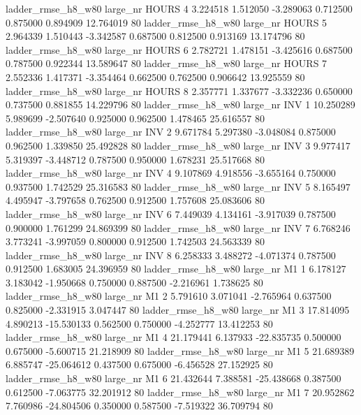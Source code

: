  ladder_rmse_h8_w80   large_nr    HOURS                 4  3.224518  1.512050  -3.289063 0.712500 0.875000  0.894909   12.764019 80
 ladder_rmse_h8_w80   large_nr    HOURS                 5  2.964339  1.510443  -3.342587 0.687500 0.812500  0.913169   13.174796 80
 ladder_rmse_h8_w80   large_nr    HOURS                 6  2.782721  1.478151  -3.425616 0.687500 0.787500  0.922344   13.589647 80
 ladder_rmse_h8_w80   large_nr    HOURS                 7  2.552336  1.417371  -3.354464 0.662500 0.762500  0.906642   13.925559 80
 ladder_rmse_h8_w80   large_nr    HOURS                 8  2.357771  1.337677  -3.332236 0.650000 0.737500  0.881855   14.229796 80
 ladder_rmse_h8_w80   large_nr      INV                 1 10.250289  5.989699  -2.507640 0.925000 0.962500  1.478465   25.616557 80
 ladder_rmse_h8_w80   large_nr      INV                 2  9.671784  5.297380  -3.048084 0.875000 0.962500  1.339850   25.492828 80
 ladder_rmse_h8_w80   large_nr      INV                 3  9.977417  5.319397  -3.448712 0.787500 0.950000  1.678231   25.517668 80
 ladder_rmse_h8_w80   large_nr      INV                 4  9.107869  4.918556  -3.655164 0.750000 0.937500  1.742529   25.316583 80
 ladder_rmse_h8_w80   large_nr      INV                 5  8.165497  4.495947  -3.797658 0.762500 0.912500  1.757608   25.083606 80
 ladder_rmse_h8_w80   large_nr      INV                 6  7.449039  4.134161  -3.917039 0.787500 0.900000  1.761299   24.869399 80
 ladder_rmse_h8_w80   large_nr      INV                 7  6.768246  3.773241  -3.997059 0.800000 0.912500  1.742503   24.563339 80
 ladder_rmse_h8_w80   large_nr      INV                 8  6.258333  3.488272  -4.071374 0.787500 0.912500  1.683005   24.396959 80
 ladder_rmse_h8_w80   large_nr       M1                 1  6.178127  3.183042  -1.950668 0.750000 0.887500 -2.216961    1.738625 80
 ladder_rmse_h8_w80   large_nr       M1                 2  5.791610  3.071041  -2.765964 0.637500 0.825000 -2.331915    3.047447 80
 ladder_rmse_h8_w80   large_nr       M1                 3 17.814095  4.890213 -15.530133 0.562500 0.750000 -4.252777   13.412253 80
 ladder_rmse_h8_w80   large_nr       M1                 4 21.179441  6.137933 -22.835735 0.500000 0.675000 -5.600715   21.218909 80
 ladder_rmse_h8_w80   large_nr       M1                 5 21.689389  6.885747 -25.064612 0.437500 0.675000 -6.456528   27.152925 80
 ladder_rmse_h8_w80   large_nr       M1                 6 21.432644  7.388581 -25.438668 0.387500 0.612500 -7.063775   32.201912 80
 ladder_rmse_h8_w80   large_nr       M1                 7 20.952862  7.760986 -24.804506 0.350000 0.587500 -7.519322   36.709794 80
